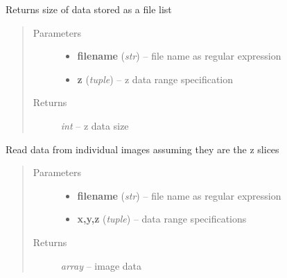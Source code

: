 \documentclass[letterpaper,10pt,english]{sphinxmanual}
\begin{document}

\begin{fulllineitems}
\label{api/ClearMap.IO:ClearMap.IO.FileList.dataZSize}
Returns size of data stored as a file list
\begin{quote}\begin{description}
\item[{Parameters}] \leavevmode\begin{itemize}
\item {} 
\textbf{filename} (\emph{str}) --
file name as regular expression

\item {} 
\textbf{z} (\emph{tuple}) --
z data range specification

\end{itemize}

\item[{Returns}] \leavevmode
\emph{int} --
z data size

\end{description}\end{quote}

\end{fulllineitems}


\begin{fulllineitems}
\label{api/ClearMap.IO:ClearMap.IO.FileList.readDataFiles}
Read data from individual images assuming they are the z slices
\begin{quote}\begin{description}
\item[{Parameters}] \leavevmode\begin{itemize}
\item {} 
\textbf{filename} (\emph{str}) --
file name as regular expression

\item {} 
\textbf{x,y,z} (\emph{tuple}) --
data range specifications

\end{itemize}

\item[{Returns}] \leavevmode
\emph{array} --
image data

\end{description}\end{quote}

\end{fulllineitems}
\end{document}
